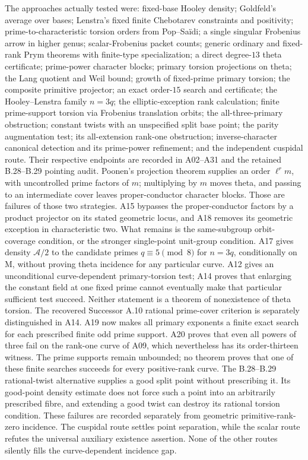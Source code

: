 The approaches actually tested were: fixed-base Hooley density;
Goldfeld's average over bases; Lenstra's fixed finite Chebotarev
constraints and positivity; prime-to-characteristic torsion orders
from Pop--Sa\"idi; a single singular Frobenius arrow in higher genus;
scalar-Frobenius packet counts; generic ordinary and fixed-rank
Prym theorems with finite-type specialization; a direct degree-$13$
theta certificate; prime-power character blocks; primary torsion
projections on theta; the Lang quotient and Weil bound; growth of
fixed-prime primary torsion; the composite primitive projector;
an exact order-$15$ search and certificate; the Hooley--Lenstra
family $n=3q$; the elliptic-exception rank calculation; finite
prime-support torsion via Frobenius translation orbits; the
all-three-primary obstruction; constant twists with an unspecified
split base point; the parity augmentation test; its all-extension rank-one obstruction;
inverse-character canonical detection and its prime-power refinement;
and the independent cuspidal route.
Their respective endpoints are recorded in A02--A31 and the
retained B.28--B.29 pointing audit. Poonen's
projection theorem supplies an order $\ell^r m$, with uncontrolled
prime factors of $m$; multiplying by $m$ moves theta, and passing to
an intermediate cover leaves proper-conductor character blocks.
Those are failures of those two strategies. A15 bypasses the
proper-conductor factors by a product projector on its stated
geometric locus, and A18 removes its geometric exception in
characteristic two. What remains is the same-subgroup orbit-coverage
condition, or the stronger single-point unit-group condition.
A17 gives density $\mathcal A/2$ to the candidate primes
$q\equiv5\pmod8$ for $n=3q$, conditionally on M, without proving
theta incidence for any particular curve. A12 gives an unconditional
curve-dependent primary-torsion test; A14 proves that enlarging the
constant field at one fixed prime cannot eventually make that
particular sufficient test succeed. Neither statement is a theorem
of nonexistence of theta torsion. The recovered Successor A.10
rational prime-cover criterion is separately distinguished in A14.
A19 now makes all primary exponents a finite exact search for
each prescribed finite odd prime support. A20 proves that even
all powers of three fail on the rank-one curve of A09, which
nevertheless has its order-thirteen witness. The prime supports
remain unbounded; no theorem proves that one of these finite
searches succeeds for every positive-rank curve.
The B.28--B.29 rational-twist alternative supplies a good split
point without prescribing it. Its good-point density estimate
does not force such a point into an arbitrarily prescribed fibre,
and extending a good twist can destroy its rational torsion
condition. These failures are recorded separately from geometric
primitive-rank-zero incidence.
The cuspidal route
settles point separation, while the scalar route refutes the
universal auxiliary existence assertion. None of the other routes
silently fills the curve-dependent incidence gap.

